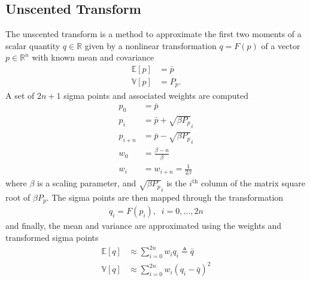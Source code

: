 \documentclass[letterpaper, paper,11pt]{AAS}
\newcommand{\E}[1]{\mathbb{E}\left[#1\right]}
\newcommand{\V}[1]{\mathbb{V}[#1]}
\begin{document}
\subsection{Unscented Transform}
The unscented transform is a method to approximate the first two moments of a scalar quantity $q\in\mathbb{R}$ given by a nonlinear transformation $q = F(p)$ of a vector $p\in\mathbb{R}^n$ with known mean and covariance
\begin{align*}
\E{p} &= \bar{p}\\
\V{p} &= P_p.
\end{align*}
A set of $2n+1$ sigma points and associated weights are computed 
\begin{align*}
p_0 &= \bar{p} \\
p_i &=  \bar{p} + \sqrt{\beta P_p}_i \\
p_{i+n} &=  \bar{p} - \sqrt{\beta P_p}_i \\
w_0 &= \frac{\beta - n}{\beta} \\
w_i &= w_{i+n} = \frac{1}{2\beta}
\end{align*}
where $\beta$ is a scaling parameter, and $\sqrt{\beta P_p}_i$ is the $i^{\mathrm{th}}$ column of the matrix square root of $\beta P_p$. The sigma points are then mapped through the transformation
\begin{align}
q_i = F(p_i),\;\;i=0,...,2n
\end{align}
and finally, the mean and variance are approximated using the weights and transformed sigma points
\begin{align*}
\E{q} &\approx \sum_{i=0}^{2n}w_iq_i  \triangleq \bar{q}\\
\V{q} &\approx \sum_{i=0}^{2n}w_i\left(q_i - \bar{q}\right)^2
\end{align*}
\end{document}
